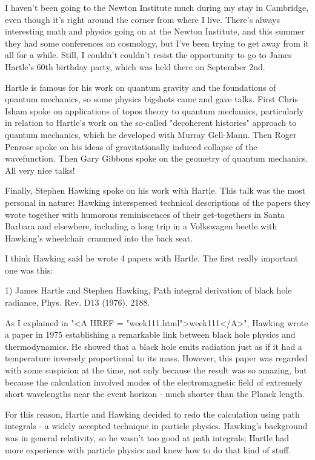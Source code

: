 

I haven't been going to the Newton Institute much during my stay 
in Cambridge, even though it's right around the corner from where 
I live.  There's always interesting math and physics going on
at the Newton Institute, and this summer they had some conferences 
on cosmology, but I've been trying to get away from it all for a 
while.  Still, I couldn't couldn't resist the opportunity to go to 
James Hartle's 60th birthday party, which was held there on September 
2nd.  

Hartle is famous for his work on quantum gravity and the foundations 
of quantum mechanics, so some physics bigshots came and gave talks.  
First Chris Isham spoke on applications of topos theory to quantum 
mechanics, particularly in relation to Hartle's work on the so-called 
"decoherent histories" approach to quantum mechanics, which he developed 
with Murray Gell-Mann.  Then Roger Penrose spoke on his ideas of 
gravitationally induced collapse of the wavefunction.  Then Gary Gibbons 
spoke on the geometry of quantum mechanics.  All very nice talks!

Finally, Stephen Hawking spoke on his work with Hartle.  This talk was 
the most personal in nature: Hawking interspersed technical descriptions 
of the papers they wrote together with humorous reminiscences of their 
get-togethers in Santa Barbara and elsewhere, including a long trip in a 
Volkswagen beetle with Hawking's wheelchair crammed into the back seat.  

I think Hawking said he wrote 4 papers with Hartle.  The first really 
important one was this:

1) James Hartle and Stephen Hawking, Path integral derivation of 
black hole radiance, Phys. Rev. D13 (1976), 2188.

As I explained in "<A HREF = "week111.html">week111</A>", Hawking wrote a paper in 1975 establishing 
a remarkable link between black hole physics and thermodynamics.  He 
showed that a black hole emits radiation just as if it had a temperature 
inversely proportional to its mass.  However, this paper was regarded 
with some suspicion at the time, not only because the result was so 
amazing, but because the calculation involved modes of the electromagnetic 
field of extremely short wavelengths near the event horizon - much shorter 
than the Planck length.

For this reason, Hartle and Hawking decided to redo the calculation
using path integrals - a widely accepted technique in particle physics.
Hawking's background was in general relativity, so he wasn't too good 
at path integrals; Hartle had more experience with particle physics 
and knew how to do that kind of stuff.  
 
